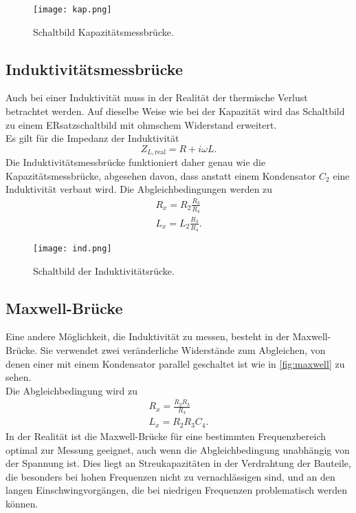     \begin{figure}
        \centering
        \texttt{[image: kap.png]}
        \caption{Schaltbild Kapazitätsmessbrücke.}
        \label{fig:kap}
    \end{figure}

\subsection{Induktivitätsmessbrücke}
    Auch bei einer Induktivität muss in der Realität der thermische Verlust betrachtet werden. Auf dieselbe Weise wie bei der Kapazität 
    wird das Schaltbild zu einem ERsatzschaltbild mit ohmschem Widerstand erweitert.\\
    Es gilt für die Impedanz der Induktivität
    \begin{equation}
        Z_{L, \text{real}} = R + i \omega L.
    \end{equation}
    Die Induktivitätsmessbrücke funktioniert daher genau wie die Kapazitätsmessbrücke, abgesehen davon, dass anstatt einem Kondensator $C_2$ 
    eine Induktivität verbaut wird. Die Abgleichbedingungen werden zu 
    \begin{align}
        R_x = R_2 \frac{R_3}{R_4}\\
        L_x = L_2 \frac{R_3}{R_4} .
    \end{align} 

    \begin{figure}
        \texttt{[image: ind.png]}
        \centering
        \caption{Schaltbild der Induktivitätsrücke.}
        \label{fig:ind}
    \end{figure}

\subsection{Maxwell-Brücke}
    Eine andere Möglichkeit, die Induktivität zu messen, besteht in der Maxwell-Brücke. Sie verwendet zwei veränderliche Widerstände zum Abgleichen,
    von denen einer mit einem Kondensator parallel geschaltet ist wie in \ref{fig:maxwell} zu sehen.\\
    Die Abgleichbedingung wird zu 
    \begin{align}
        R_x = \frac{R_2 R_3}{R_4}\\
        L_x = R_2 R_3 C_4 .
    \end{align}
    In der Realität ist die Maxwell-Brücke für eine bestimmten Frequenzbereich optimal zur Messung geeignet, auch wenn die Abgleichbedingung unabhängig
    von der Spannung ist. Dies liegt an Streukapazitäten in der Verdrahtung der Bauteile, die besonders bei hohen Frequenzen nicht zu vernachlässigen sind, 
    und an den langen Einschwingvorgängen, die bei niedrigen Frequenzen problematisch werden können.

